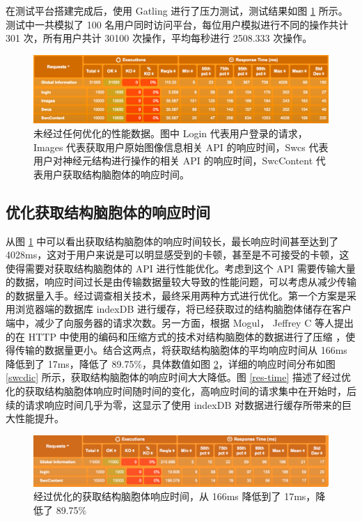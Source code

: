 在测试平台搭建完成后，使用 Gatling 进行了压力测试，测试结果如图 \ref{origin} 所示。测试中一共模拟了 100 名用户同时访问平台，每位用户模拟进行不同的操作共计 301 次，所有用户共计 30100 次操作，平均每秒进行 2508.333 次操作。

\begin{figure}[!ht]
\centering
\includegraphics[width=148mm]{images/origin}
\caption{未经过任何优化的性能数据。图中 Login 代表用户登录的请求，Images 代表获取用户原始图像信息相关 API 的响应时间，Swcs 代表用户对神经元结构进行操作的相关 API 的响应时间，SwcContent 代表用户获取结构脑胞体的响应时间。}
\label{origin}
\end{figure}

\subsection{优化获取结构脑胞体的响应时间}
从图 \ref{origin} 中可以看出获取结构脑胞体的响应时间较长，最长响应时间甚至达到了 4028ms，这对于用户来说是可以明显感受到的卡顿，甚至是不可接受的卡顿，这使得需要对获取结构脑胞体的 API 进行性能优化。考虑到这个 API 需要传输大量的数据，响应时间过长是由传输数据量较大导致的性能问题，可以考虑从减少传输的数据量入手。经过调查相关技术，最终采用两种方式进行优化。第一个方案是采用浏览器端的数据库 indexDB 进行缓存，将已经获取过的结构脑胞体储存在客户端中，减少了向服务器的请求次数。另一方面，根据 Mogul， Jeffrey C 等人提出的在 HTTP 中使用的编码和压缩方式的技术对结构脑胞体的数据进行了压缩 ，使得传输的数据量更小。结合这两点，将获取结构脑胞体的平均响应时间从 166ms 降低到了 17ms，降低了 89.75\%，具体数值如图 \ref{swccontent}，详细的响应时间分布如图 \ref{swcdic} 所示，获取结构脑胞体的响应时间大大降低。图 \ref{res-time} 描述了经过优化的获取结构脑胞体响应时间随时间的变化，高响应时间的请求集中在开始时，后续的请求响应时间几乎为零，这显示了使用 indexDB 对数据进行缓存所带来的巨大性能提升。

\begin{figure}[!ht]
\centering
\includegraphics[width=148mm]{images/swccontent}
\caption{经过优化的获取结构脑胞体响应时间，从 166ms 降低到了 17ms，降低了 89.75\%}
\label{swccontent}
\end{figure}

